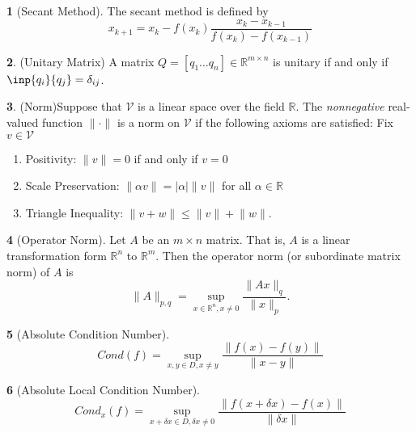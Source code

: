 \documentclass[12pt]{article}
\theoremstyle{definition}
\newtheorem{definition}{\color{NavyBlue}{\textbf{Definition}}}
\newcommand{\R}{\mathbb{R}}
\newcommand{\norm}[1]{\lVert#1\rVert}
\begin{document}
\begin{definition}[Secant Method]
The secant method is defined by
\begin{equation}
x_{k+1} = x_k - f(x_k) \frac{x_k - x_{k-1}}{f(x_k) - f(x_{k-1})}
\end{equation}
\end{definition}

\begin{definition}(Unitary Matrix)
A matrix $Q = [q_1 \ldots q_n] \in \R^{m\times n}$ is unitary if and only if $\inp{q_i}{q_j} = \delta_{ij}$.
\end{definition}

\begin{definition}(Norm)\label{norm}
Suppose that $\mathcal{V}$ is a linear space over the field $\R$. The \textit{nonnegative} real-valued function $\norm{\cdot}$ is a norm on $\mathcal{V}$ if the following axioms are satisfied: Fix $v \in \mathcal{V}$
\begin{enumerate}
\item Positivity: $\norm{v} = 0$ if and only if $v = 0$
\item Scale Preservation: $\norm{\alpha v} = |\alpha| \norm{v}$ for all $\alpha \in \R$
\item Triangle Inequality: $\norm{v + w} \leq \norm{v} + \norm{w}$.
\end{enumerate}
\end{definition}

\begin{definition}[Operator Norm]
Let $A$ be an $m \times n$ matrix. That is, $A$ is a linear transformation form $\R^n$ to $\R^m$. Then the operator norm (or subordinate matrix norm) of $A$ is
\begin{equation}
\norm{A}_{p,q} = \sup_{x \in \R^n, x\neq 0} \frac{\norm{Ax}_q}{\norm{x}_p}.
\end{equation}
\end{definition}

\begin{definition}[Absolute Condition Number]
\begin{equation}
Cond(f) = \sup_{x,y \in D, x\neq y} \frac{\norm{f(x) - f(y)}}{\norm{x - y}}
\end{equation}
\end{definition}

\begin{definition}[Absolute Local Condition Number]
\begin{equation}
Cond_x(f) = \sup_{x + \delta x \in D, \delta x \neq 0} \frac{\norm{f(x + \delta x) - f(x)}}{\norm{\delta x}}
\end{equation}
\end{definition}
\end{document}
